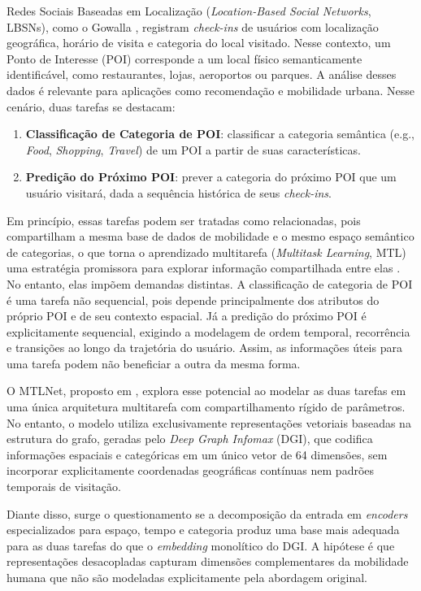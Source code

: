 Redes Sociais Baseadas em Localização (\textit{Location-Based Social Networks}, LBSNs), como o Gowalla \cite{cho2011friendship,jure2014snap}, registram \textit{check-ins} de usuários com localização geográfica, horário de visita e categoria do local visitado. Nesse contexto, um Ponto de Interesse (POI) corresponde a um local físico semanticamente identificável, como restaurantes, lojas, aeroportos ou parques. A análise desses dados é relevante para aplicações como recomendação e mobilidade urbana. Nesse cenário, duas tarefas se destacam:

\begin{enumerate}
    \item \textbf{Classificação de Categoria de POI}: classificar a categoria semântica (e.g., \textit{Food}, \textit{Shopping}, \textit{Travel}) de um POI a partir de suas características.
    \item \textbf{Predição do Próximo POI}: prever a categoria do próximo POI que um usuário visitará, dada a sequência histórica de seus \textit{check-ins}.
\end{enumerate}

Em princípio, essas tarefas podem ser tratadas como relacionadas, pois compartilham a mesma base de dados de mobilidade e o mesmo espaço semântico de categorias, o que torna o aprendizado multitarefa (\textit{Multitask Learning}, MTL) uma estratégia promissora para explorar informação compartilhada entre elas \cite{caruana1997multitask}. No entanto, elas impõem demandas distintas. A classificação de categoria de POI é uma tarefa não sequencial, pois depende principalmente dos atributos do próprio POI e de seu contexto espacial. Já a predição do próximo POI é explicitamente sequencial, exigindo a modelagem de ordem temporal, recorrência e transições ao longo da trajetória do usuário. Assim, as informações úteis para uma tarefa podem não beneficiar a outra da mesma forma.

O MTLNet, proposto em \cite{silva2025mtlnet}, explora esse potencial ao modelar as duas tarefas em uma única arquitetura multitarefa com compartilhamento rígido de parâmetros. No entanto, o modelo utiliza exclusivamente representações vetoriais baseadas na estrutura do grafo, geradas pelo\textit{ Deep Graph Infomax} (DGI), que codifica informações espaciais e categóricas em um único vetor de 64 dimensões, sem incorporar explicitamente coordenadas geográficas contínuas nem padrões temporais de visitação.

Diante disso, surge o questionamento se a decomposição da entrada em \textit{encoders} especializados para espaço, tempo e categoria produz uma base mais adequada para as duas tarefas do que o \textit{embedding} monolítico do DGI. A hipótese é que representações desacopladas capturam dimensões complementares da mobilidade humana que não são modeladas explicitamente pela abordagem original.

